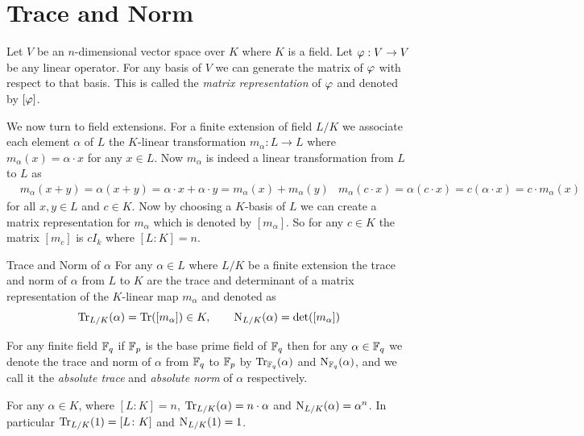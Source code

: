 \section{Trace and Norm}
Let $V$ be an $n$-dimensional vector space over $K$ where $K$ is a field.
Let $\varphi:V\to V$ be any linear operator.
For any basis of $V$ we can generate the matrix of $\varphi$ with respect to that basis.
This is called the \emph{matrix representation} of $\varphi$ and denoted by $[\varphi]$.

We now turn to field extensions.
For a finite extension of field $L/K$ we associate each element $\alpha$ of $L$ the $K$-linear transformation $m_{\alpha}:L\to L$ where $m_{\alpha}(x)=\alpha\cdot x$ for any $x\in L$.
Now $m_{\alpha}$ is indeed a linear transformation from $L$ to $L$ as
\begin{align*}
  & m_{\alpha}(x+y)=\alpha(x+y)=\alpha\cdot x+\alpha\cdot y=m_{\alpha}(x)+m_{\alpha}(y) & m_{\alpha}(c\cdot x)=\alpha(c\cdot x)=c(\alpha\cdot x)=c\cdot m_{\alpha}(x)
\end{align*}
for all $x,y\in L$ and $c\in K$.
Now by choosing a $K$-basis of $L$ we can create a matrix representation for $m_{\alpha}$ which is denoted by $[m_{\alpha}]$.
So for any $c\in K$ the matrix $[m_c]$ is $cI_k$ where $[L\colon K]=n$.

\begin{Definition}{Trace and Norm of $\alpha$}{}
  For any $\alpha\in L$ where $L/K$ be a finite extension the trace and norm of $\alpha$ from $L$ to $K$ are the trace and determinant of a matrix representation of the $K$-linear map $m_{\alpha}$ and denoted as $$\operatorname{Tr}_{L/K}(\alpha)=\operatorname{Tr}([m_{\alpha}])\in K,\qquad \operatorname{N}_{L/K}(\alpha)=\det([m_{\alpha}])$$
\end{Definition}

For any finite field $\mathbb{F}_q$ if $\mathbb{F}_p$ is the base prime field of $\mathbb{F}_q$ then for any $\alpha\in\mathbb{F}_q$ we denote the trace and norm of $\alpha$ from $\mathbb{F}_q$ to $\mathbb{F}_p$ by $\operatorname{Tr}_{\mathbb{F}_q}(\alpha)$ and $\operatorname{N}_{\mathbb{F}_q}(\alpha)$, and we call it the \emph{absolute trace} and \emph{absolute norm} of $\alpha$ respectively.

\begin{observation}
  For any $\alpha\in K$, where $[L\colon K]=n$, $\operatorname{Tr}_{L/K}(\alpha)=n\cdot \alpha$ and $\operatorname{N}_{L/K}(\alpha)=\alpha^n$. In particular $\operatorname{Tr}_{L/K}(1)=[L\colon K]$ and $
    \operatorname{N}_{L/K}(1)=1$.
\end{observation}

